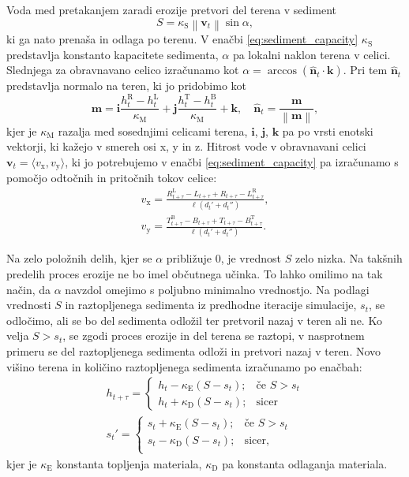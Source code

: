 \documentclass[9pt]{pnas-new}
\renewcommand{\vec}[1]{\ensuremath{\mathbf{#1}}}
\newcommand{\uvec}[1]{\ensuremath{\hat{\vec{#1}}}}
\newcommand{\const}[1]{{\ensuremath{\kappa_\mathrm{#1}}}}
\begin{document}
Voda med pretakanjem zaradi erozije pretvori del terena v sediment
\begin{equation} \label{eq:sediment_capacity}
S = \kappa_\mathrm{S} \left\| \vec{v}_t \right\| \sin{\alpha},
\end{equation}
ki ga nato prenaša in odlaga po terenu. V enačbi \eqref{eq:sediment_capacity} $\kappa_\mathrm{S}$ predstavlja konstanto kapacitete sedimenta, $\alpha$ pa lokalni naklon terena v celici. Slednjega za obravnavano celico izračunamo kot $\alpha  = \arccos(\uvec{n}_t \cdot \vec{k})$. Pri tem $\uvec{n}_t$ predstavlja normalo na teren, ki jo pridobimo kot
\begin{equation}
\vec{m} = \vec{i}\frac{h^{\mathrm{R}}_t - h^{\mathrm{L}}_t}{\const{M}} + \vec{j}\frac{h^{\mathrm{T}}_t - h^{\mathrm{B}}_t}{\const{M}} + \vec{k},
\quad
\uvec{n}_t = \frac{\vec{m}}{\left\|\vec{m}\right\|},
\end{equation}
kjer je $\const{M}$ razalja med sosednjimi celicami terena, $\vec{i}$, $\vec{j}$, $\vec{k}$ pa po vrsti enotski vektorji, ki kažejo v smereh osi x, y in z. Hitrost vode v obravnavani celici $\vec{v}_t = \langle v_\mathrm{x}, v_\mathrm{y} \rangle$, ki jo potrebujemo v enačbi \eqref{eq:sediment_capacity} pa izračunamo s pomočjo odtočnih in pritočnih tokov celice:
\begin{eqnarray} \label{eq:velocity1}
v_\mathrm{x}=\frac{R^\mathrm{L}_{t+\tau} - L_{t+\tau} + R_{t+\tau} - L^\mathrm{R}_{t+\tau}}{\ell ({d_t}' + {d_t}'')}, \\
v_\mathrm{y}=\frac{T^{\mathrm{B}}_{t+\tau} - B_{t+\tau} + T_{t+\tau} - B^{\mathrm{T}}_{t+\tau}}{\ell ({d_t}' + {d_t}'')}.
\end{eqnarray}

Na zelo položnih delih, kjer se $\alpha$ približuje 0, je vrednost $S$ zelo nizka. Na takšnih predelih proces erozije ne bo imel občutnega učinka. To lahko omilimo na tak način, da $\alpha$ navzdol omejimo s poljubno minimalno vrednostjo. Na podlagi vrednosti $S$ in raztopljenega sedimenta iz predhodne iteracije simulacije, $s_t$, se odločimo, ali se bo del sedimenta odložil ter pretvoril nazaj v teren ali ne. Ko velja $S > s_t$, se zgodi proces erozije in del terena se raztopi, v nasprotnem primeru se del raztopljenega sedimenta odloži in pretvori nazaj v teren. Novo višino terena in količino raztopljenega sedimenta izračunamo po enačbah:
\begin{eqnarray}
h_{t+\tau} = 
\begin{cases}
h_t - \kappa_\mathrm{E} (S - s_t); &\text{če } S > s_t\\
h_t + \kappa_\mathrm{D} (S - s_t); &\text{sicer}
\end{cases}\\
{s_{t}}' =
\begin{cases}
s_t + \kappa_\mathrm{E} (S - s_t); &\text{če } S > s_t\\
s_t - \kappa_\mathrm{D} (S - s_t); &\text{sicer,}\\
\end{cases}
\end{eqnarray}
kjer je $\kappa_\mathrm{E}$ konstanta topljenja materiala, $\kappa_\mathrm{D}$ pa konstanta odlaganja materiala.
\end{document}
